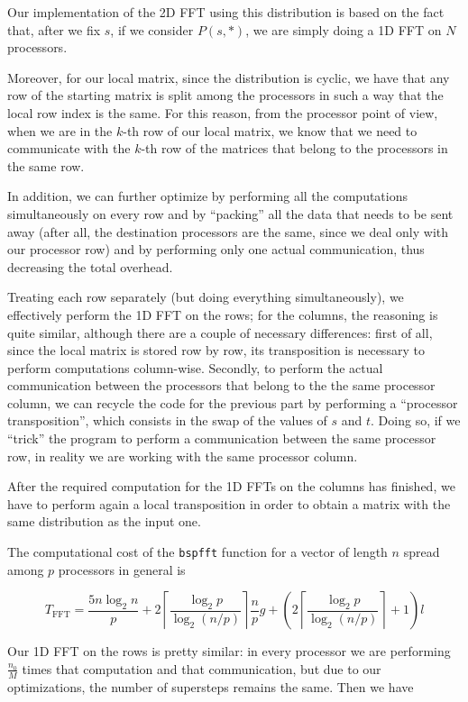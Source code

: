 \documentclass[a4paper,11pt]{article}
\begin{document}
Our implementation of the 2D FFT using this distribution is based on the fact that, after we fix $s$, if we consider $P(s,*)$, we are simply doing a 1D FFT on $N$ processors. 

Moreover, for our local matrix, since the distribution is cyclic, we have that any row of the starting matrix is split among the processors in such a way that the local row index is the same. For this reason, from the processor point of view, when we are in the $k$-th row of our local matrix, we know that we need to communicate with the $k$-th row of the matrices that belong to the processors in the same row. 

In addition, we can further optimize by performing all the computations simultaneously on every row and by ``packing'' all the data that needs to be sent away (after all, the destination processors are the same, since we deal only with our processor row) and by performing only one actual communication, thus decreasing the total overhead.

Treating each row separately (but doing everything simultaneously), we effectively perform the 1D FFT on the rows; for the columns, the reasoning is quite similar, although there are a couple of necessary differences: first of all, since the local matrix is stored row by row, its transposition is necessary to perform computations column-wise. Secondly, to perform the actual communication between the processors that belong to the the same processor column, we can recycle the code for the previous part by performing a ``processor transposition'', which consists in the swap of the values of $s$ and $t$. Doing so, if we ``trick'' the program to perform a communication between the same processor row, in reality we are working with the same processor column.

After the required computation for the 1D FFTs on the columns has finished, we have to perform again a local transposition in order to obtain a matrix with the same distribution as the input one.

The computational cost of the \verb|bspfft| function for a vector of length $n$ spread among $p$ processors in general is \citep{parsc}

$$T_{\text{FFT}} = \dfrac{5n \log_2 n}{p} + 2 \left\lceil \dfrac{\log_2 p}{\log_2 (n/p)} \right\rceil \dfrac{n}{p} g + \left( 2 \left\lceil \dfrac{\log_2 p}{\log_2 (n/p)} \right\rceil +1 \right) l$$

Our 1D FFT on the rows is pretty similar: in every processor we are performing $\frac{n_0}{M}$ times that computation and that communication, but due to our optimizations, the number of supersteps remains the same. Then we have
\end{document}

